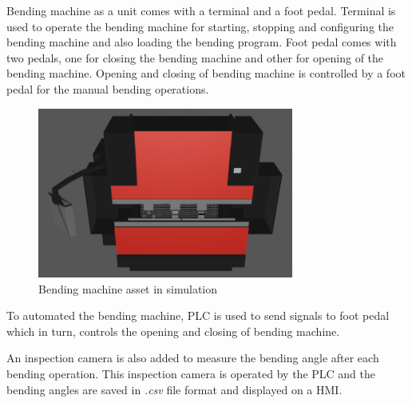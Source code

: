 
Bending machine as a unit comes with a terminal and a foot pedal. Terminal is used to operate
the bending machine for starting, stopping and configuring the bending machine and also loading the bending program.
Foot pedal comes with two pedals, one for closing the bending machine and other for opening of the bending machine.
Opening and closing of bending machine is controlled by a foot pedal for the manual bending operations.

\begin{figure}[h]
    \centering
    \includegraphics[width=0.75\textwidth]{figures/bending-machine-blender.png}
    \caption{Bending machine asset in simulation}
    \label{fig:bending-machine-blender}
\end{figure}
To automated the bending machine, PLC is used to send signals to foot pedal which in turn, controls the opening and closing of bending machine.

An inspection camera is also added to measure the bending angle after each bending operation. This inspection camera is operated by the PLC
and the bending angles are saved in \textit{.csv} file format and displayed on a HMI.
